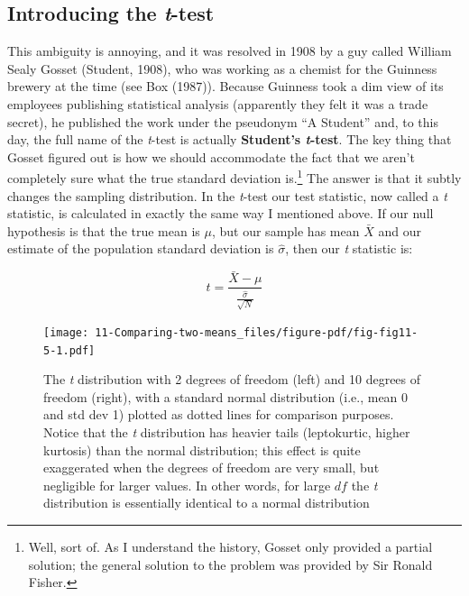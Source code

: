 \documentclass[
  a4paper,
]{book}
\begin{document}
\hypertarget{introducing-the-t-test}{%
\subsection{\texorpdfstring{Introducing the
\emph{t}-test}{Introducing the t-test}}\label{introducing-the-t-test}}

This ambiguity is annoying, and it was resolved in 1908 by a guy called
William Sealy Gosset (Student, 1908), who was working as a chemist for
the Guinness brewery at the time (see Box (1987)). Because Guinness took
a dim view of its employees publishing statistical analysis (apparently
they felt it was a trade secret), he published the work under the
pseudonym ``A Student'' and, to this day, the full name of the
\emph{t}-test is actually \textbf{Student's \emph{t}-test}. The key
thing that Gosset figured out is how we should accommodate the fact that
we aren't completely sure what the true standard deviation
is.\footnote{Well, sort of. As I understand the history, Gosset only
  provided a partial solution; the general solution to the problem was
  provided by Sir Ronald Fisher.} The answer is that it subtly changes
the sampling distribution. In the \emph{t}-test our test statistic, now
called a \emph{t} statistic, is calculated in exactly the same way I
mentioned above. If our null hypothesis is that the true mean is
\(\mu\), but our sample has mean \(\bar{X}\) and our estimate of the
population standard deviation is \(\hat{\sigma}\), then our \emph{t}
statistic is:

\[
t=\frac{\bar{X}-\mu}{\frac{\hat{\sigma}}{\sqrt{N}}}
\]

\begin{figure}

\texttt{[image: 11-Comparing-two-means\_files/figure-pdf/fig-fig11-5-1.pdf]} \hfill{}

\caption{\label{fig-fig11-5}The \emph{t} distribution with 2 degrees of
freedom (left) and 10 degrees of freedom (right), with a standard normal
distribution (i.e., mean 0 and std dev 1) plotted as dotted lines for
comparison purposes. Notice that the \emph{t} distribution has heavier
tails (leptokurtic, higher kurtosis) than the normal distribution; this
effect is quite exaggerated when the degrees of freedom are very small,
but negligible for larger values. In other words, for large \(df\) the
\emph{t} distribution is essentially identical to a normal distribution}

\end{figure}
\end{document}
